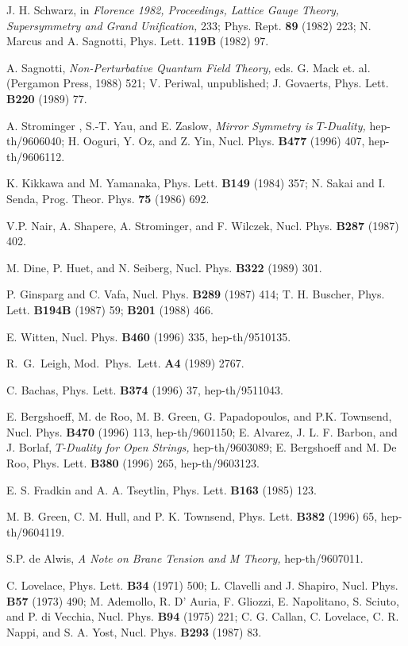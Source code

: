 \begin{thebibliography}{99}
J. H. Schwarz, in {\it Florence 1982, Proceedings, Lattice Gauge Theory,
Supersymmetry and Grand Unification,} 233; Phys. Rept. {\bf 89} (1982)
223;\hfil\break
N. Marcus and A. Sagnotti, Phys. Lett. {\bf 119B} (1982) 97.

A. Sagnotti, {\it
Non-Perturbative Quantum Field Theory,}
eds. G. Mack et. al. (Pergamon Press, 1988) 521;\hfil\break
V. Periwal, unpublished;\hfil\break
J. Govaerts, Phys. Lett. {\bf B220} (1989) 77.

A. Strominger , S.-T. Yau, and E. Zaslow, {\it Mirror Symmetry is
$T$-Duality,} hep-th/9606040;\hfil\break
H. Ooguri, Y. Oz, and Z. Yin, Nucl. Phys. {\bf B477} (1996) 407, 
hep-th/9606112.

K. Kikkawa and M. Yamanaka, Phys. Lett. {\bf B149} (1984) 357;\hfil\break 
N. Sakai and I. Senda, Prog. Theor. Phys. {\bf 75} (1986) 692.

V.P. Nair, A. Shapere, A. Strominger, and F. Wilczek,
Nucl. Phys. {\bf B287} (1987) 402.

M. Dine, P. Huet, and N. Seiberg, Nucl. Phys. {\bf
B322} (1989) 301.

P. Ginsparg and C. Vafa, Nucl. Phys. {\bf B289} (1987) 414;\hfil\break 
T. H. Buscher, Phys. Lett. {\bf B194B} (1987) 59; {\bf B201} (1988) 466. 

E. Witten, Nucl. Phys. {\bf B460} (1996) 335, hep-th/9510135.

R.~G.~Leigh, Mod.~Phys.~Lett. {\bf A4} (1989) 2767.

C. Bachas, Phys. Lett. {\bf B374} (1996) 37, hep-th/9511043.

E. Bergshoeff, M. de Roo, M. B. Green, G. Papadopoulos, and P.K.
Townsend, Nucl. Phys. {\bf B470} (1996) 113, hep-th/9601150;\hfil\break
E. Alvarez, J. L. F. Barbon, and J. Borlaf, {\it $T$-Duality for Open
Strings,} hep-th/9603089;\hfil\break
E. Bergshoeff and M. De Roo, Phys. Lett. {\bf B380} (1996) 265,
hep-th/9603123.

E. S. Fradkin and A. A. Tseytlin, Phys.
Lett. {\bf B163} (1985) 123.

M. B. Green, C. M. Hull, and P. K. Townsend,
Phys. Lett. {\bf B382} (1996) 65, hep-th/9604119.

S.P. de Alwis, {\it A Note on Brane Tension and M Theory,}
hep-th/9607011.

C. Lovelace, Phys. Lett. {\bf B34} (1971) 500;\hfil\break
L. Clavelli and J. Shapiro, Nucl. Phys. {\bf B57} (1973) 490;\hfil\break
M. Ademollo, R. D' Auria, F. Gliozzi, E. Napolitano, S. Sciuto, and P. di
Vecchia, Nucl. Phys. {\bf B94} (1975) 221;\hfil\break
C. G. Callan, C. Lovelace, C. R. Nappi, and S. A. Yost,
Nucl. Phys. {\bf B293} (1987) 83.


\end{thebibliography}
